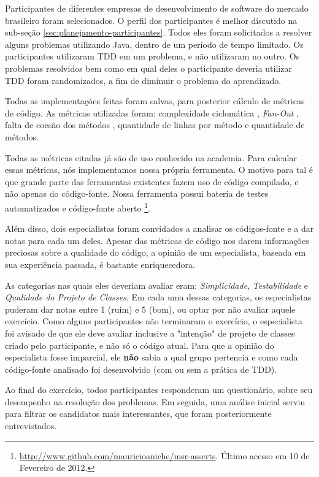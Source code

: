 \documentclass[conference]{IEEEtran}
\begin{document}
Participantes de diferentes empresas de desenvolvimento de software do mercado
brasileiro foram selecionados. O perfil dos participantes é melhor 
discutido na sub-seção \ref{sec:planejamento-participantes}. 
Todos eles foram solicitados a resolver 
alguns problemas utilizando Java, dentro de um período de tempo limitado. 
Os participantes utilizaram TDD em um problema, e não utilizaram
no outro. Os problemas resolvidos bem como em qual deles o participante
deveria utilizar TDD foram randomizados, a fim de diminuir o problema do aprendizado.

Todas as implementações feitas foram salvas, para posterior
cálculo de métricas de código. 
As métricas utilizadas foram: complexidade ciclomática \cite{mccabe}, \textit{Fan-Out} \cite{lorenz},
falta de coesão dos métodos \cite{lcom-hs}, quantidade de linhas por método e quantidade de métodos.

Todas as métricas citadas já são de uso conhecido na academia. Para calcular essas
métricas, nós implementamos nossa própria ferramenta. O motivo para tal é que
grande parte das ferramentas existentes fazem uso de código compilado, e não
apenas do código-fonte. Nossa ferramenta possui bateria de testes automatizados
e código-fonte aberto \footnote{\url{http://www.github.com/mauricioaniche/msr-asserts}. 
Último acesso em 10 de Fevereiro de 2012.}.

Além disso, dois especialistas foram convidados a analisar os códigos-fonte e a dar notas para cada
um deles. Apesar das métricas de código nos darem informações
preciosas sobre a qualidade do código, a opinião de um especialista, baseada
em sua experiência passada, é bastante enriquecedora.

As categorias nas quais eles deveriam avaliar eram: \textit{Simplicidade}, \textit{Testabilidade} e
\textit{Qualidade do Projeto de Classes}.
Em cada uma dessas categorias, os especialistas puderam dar notas entre
1 (ruim) e 5 (bom), ou optar por não avaliar aquele exercício.
Como alguns participantes não terminaram o exercício, o especialista
foi avisado de que ele deve avaliar inclusive a "intenção" de projeto de classes criado
pelo participante, e não só o código atual. 
Para que a opinião do especialista fosse imparcial, ele \textbf{não} sabia a qual grupo
pertencia e como cada código-fonte analisado foi desenvolvido (com ou sem a prática de TDD).

Ao final do exercício, todos participantes
responderam um questionário, sobre seu desempenho na resolução dos problemas.
Em seguida, uma análise inicial serviu para filtrar os candidatos
mais interessantes, que foram posteriormente entrevistados. 
\end{document}
